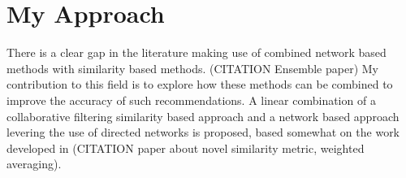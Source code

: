\section{My Approach}
There is a clear gap in the literature making use of combined network based methods with similarity based methods. (CITATION Ensemble paper) My contribution to this field is to explore how these methods can be combined to improve the accuracy of such recommendations. A linear combination of a collaborative filtering similarity based approach and a network based approach levering the use of directed networks is proposed, based somewhat on the work developed in (CITATION paper about novel similarity metric, weighted averaging).